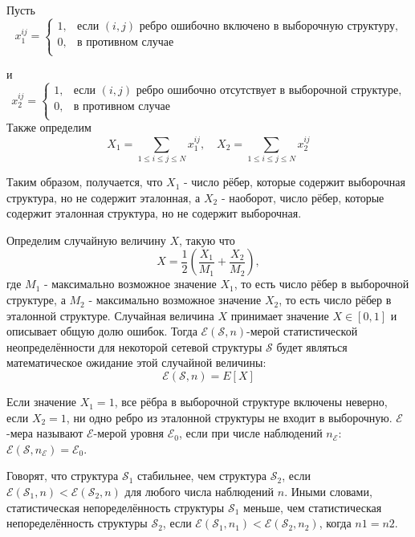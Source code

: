 Пусть 
\begin{equation*}
  x_{1}^{i j} =
    \begin{cases}
      1, & \text{если $(i,j)$ ребро ошибочно включено в выборочную структуру,}\\
      0, & \text{в противном случае}\\
    \end{cases}       
\end{equation*}

и
\begin{equation*}
  x_{2}^{i j} =
    \begin{cases}
      1, & \text{если $(i,j)$ ребро ошибочно отсутствует в выборочной структуре,}\\
      0, & \text{в противном случае}\\
    \end{cases}       
\end{equation*}
Также определим
\[
X_1=\sum_{1\leq i \leq j \leq N}{x_{1}^{i j}}, \quad  X_2=\sum_{1\leq i \leq j \leq N}{x_{2}^{i j}}
\]

Таким образом, получается, что $X_1$ - число рёбер, которые содержит выборочная структура, но не содержит эталонная, а $X_2$ - наоборот, число рёбер, которые содержит эталонная структура, но не содержит выборочная.

Определим случайную величину $X$, такую что
\begin{equation}
X = \frac{1}{2}\left( \frac{X_1}{M_1}+\frac{X_2}{M_2} \right),
\end{equation}
где $M_1$ - максимально возможное значение $X_1$, то есть число рёбер в выборочной структуре, а $M_2$ - максимально возможное значение $X_2$, то есть число рёбер в эталонной структуре. Случайная величина $X$ принимает значение $X \in [0,1]$ и описывает общую долю ошибок. 
Тогда $\mathcal{E}(\mathcal{S}, n)$-мерой статистической неопределённости для некоторой сетевой структуры $\mathcal{S}$ будет являться математическое ожидание этой случайной величины: 
\begin{equation}
\mathcal{E}(\mathcal{S},n) = E[X]
\end{equation}

Если значение $X_1=1$, все рёбра в выборочной структуре включены неверно, если $X_2=1$, ни одно ребро из эталонной структуры не входит в выборочную. $\mathcal{E}$-мера называют $\mathcal{E}$-мерой уровня $\mathcal{E}_0$, если при числе наблюдений $n_\mathcal{E}$: $\mathcal{E}(\mathcal{S},n_\mathcal{E}) = \mathcal{E}_0$.

Говорят, что структура $\mathcal{S}_1$ стабильнее, чем структура $\mathcal{S}_2$, если $\mathcal{E}( \mathcal{S}_1, n) < \mathcal{E}(\mathcal{S}_2,n) $ для любого числа наблюдений $n$. Иными словами, статистическая непоределённость структуры $\mathcal{S}_1$  меньше, чем статистическая непоределённость структуры $\mathcal{S}_2$, если $\mathcal{E}(\mathcal{S}_1,n_1) < \mathcal{E}(\mathcal{S}_2,n_2) $, когда $n1=n2$.


